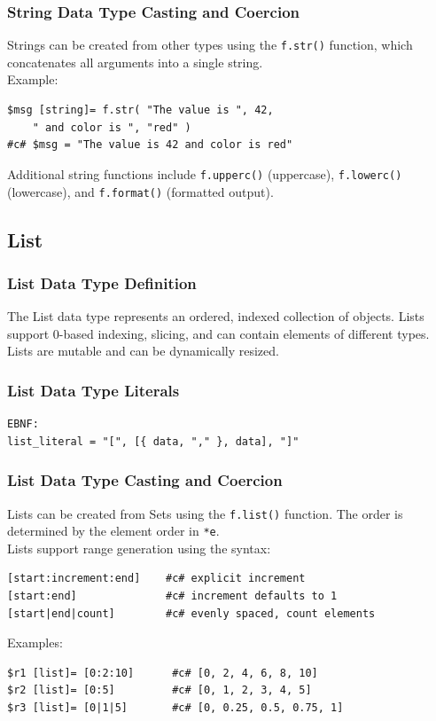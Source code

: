\documentclass{report}
\begin{document}
\subsubsection{String Data Type Casting and Coercion}
Strings can be created from other types using the \texttt{f.str()} function, which concatenates all arguments into a single string.\\
Example:
\begin{verbatim}
$msg [string]= f.str( "The value is ", 42, 
    " and color is ", "red" )
#c# $msg = "The value is 42 and color is red"
\end{verbatim}
Additional string functions include \texttt{f.upperc()} (uppercase), \texttt{f.lowerc()} (lowercase), and \texttt{f.format()} (formatted output).
\subsection{List}
\subsubsection{List Data Type Definition}
The List data type represents an ordered, indexed collection of objects. Lists support 0-based indexing, slicing, and can contain elements of different types. Lists are mutable and can be dynamically resized.
\subsubsection{List Data Type Literals}
\begin{verbatim}
EBNF:
list_literal = "[", [{ data, "," }, data], "]"
\end{verbatim}
\subsubsection{List Data Type Casting and Coercion}
Lists can be created from Sets using the \texttt{f.list()} function. The order is determined by the element order in \texttt{*e}.\\
Lists support range generation using the syntax:
\begin{verbatim}
[start:increment:end]    #c# explicit increment
[start:end]              #c# increment defaults to 1
[start|end|count]        #c# evenly spaced, count elements
\end{verbatim}
Examples:
\begin{verbatim}
$r1 [list]= [0:2:10]      #c# [0, 2, 4, 6, 8, 10]
$r2 [list]= [0:5]         #c# [0, 1, 2, 3, 4, 5]
$r3 [list]= [0|1|5]       #c# [0, 0.25, 0.5, 0.75, 1]
\end{verbatim}
\end{document}
